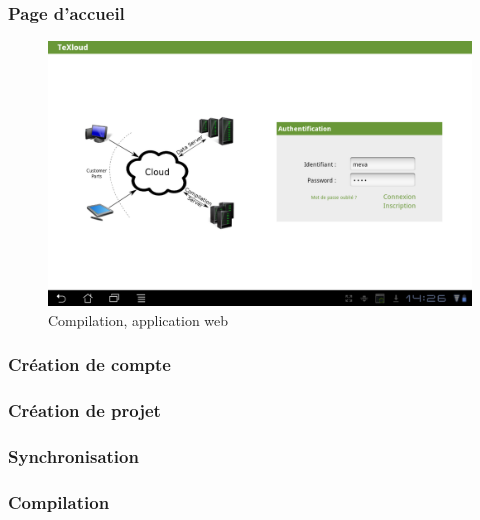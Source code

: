 \documentclass[a4paper,12pt]{article}
\begin{document}
\subsubsection{Page d'accueil}
\begin{figure}[!ht]
\begin{center}
  \includegraphics[width=1\textwidth]{./images/screenshot/android_accueil.png}
\end{center}
  \caption{Compilation, application web}
  \label{compilation}
\end{figure}
\subsubsection{Création de compte}
\paragraph*{}

\subsubsection{Création de projet}
\paragraph*{}

\subsubsection{Synchronisation}
\paragraph*{}

\subsubsection{Compilation}
\end{document}
